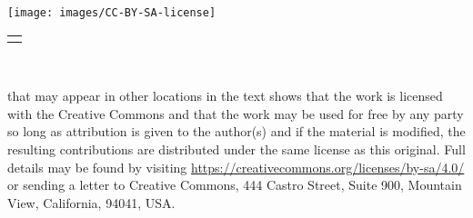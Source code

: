 \documentclass[10pt,]{book}
\theoremstyle{plain}
\theoremstyle{definition}
\theoremstyle{definition}
\theoremstyle{definition}
\theoremstyle{definition}
\numberwithin{equation}{section}
\newlength{\panelmax}
\begin{document}
{%
\setlength{\panelmax}{0pt}
\ifdefined\panelboxAimage\else\newsavebox{\panelboxAimage}\fi%
\begin{lrbox}{\panelboxAimage}
\texttt{[image: images/CC-BY-SA-license]}
\end{lrbox}
\ifdefined\phAimage\else\newlength{\phAimage}\fi%
\setlength{\phAimage}{\ht\panelboxAimage+\dp\panelboxAimage}
\settototalheight{\phAimage}{\usebox{\panelboxAimage}}
\setlength{\panelmax}{\maxof{\panelmax}{\phAimage}}
\leavevmode%
\setlength{\tabcolsep}{0\linewidth}
\par\medskip\noindent
\hspace*{0.375\linewidth}%
\begin{tabular}{@{}*{1}{c}@{}}
\begin{minipage}[c][\panelmax][t]{0.25\linewidth}\usebox{\panelboxAimage}\end{minipage}\end{tabular}\\
}%
 that may appear in other locations in the text shows that the work is licensed with the Creative Commons and that the work may be used for free by any party so long as attribution is given to the author(s) and if the material is modified, the resulting contributions are distributed under the same license as this original. Full details may be found by visiting \href{https://creativecommons.org/licenses/by-sa/4.0/}{https://creativecommons.org/licenses/by-sa/4.0/}  or sending a letter to Creative Commons, 444 Castro Street, Suite 900, Mountain View, California, 94041, USA.\par\medskip
{}
\null\clearpage
\end{document}
